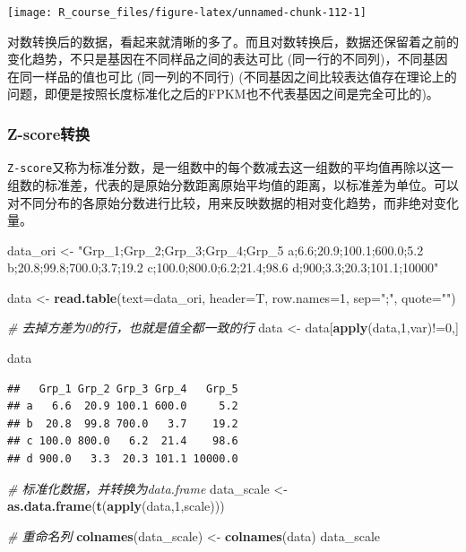 \documentclass[]{article}
\newenvironment{Shaded}{\begin{snugshade}}{\end{snugshade}}
\newcommand{\KeywordTok}[1]{\textcolor[rgb]{0.13,0.29,0.53}{\textbf{{#1}}}}
\newcommand{\DataTypeTok}[1]{\textcolor[rgb]{0.13,0.29,0.53}{{#1}}}
\newcommand{\DecValTok}[1]{\textcolor[rgb]{0.00,0.00,0.81}{{#1}}}
\newcommand{\StringTok}[1]{\textcolor[rgb]{0.31,0.60,0.02}{{#1}}}
\newcommand{\CommentTok}[1]{\textcolor[rgb]{0.56,0.35,0.01}{\textit{{#1}}}}
\newcommand{\NormalTok}[1]{{#1}}
\numberwithin{figure}{section}
\numberwithin{table}{section}
\theoremstyle{definition}
\theoremstyle{definition}
\theoremstyle{definition}
\theoremstyle{remark}
\begin{document}
\begin{center}\texttt{[image: R\_course\_files/figure-latex/unnamed-chunk-112-1]} \end{center}

对数转换后的数据，看起来就清晰的多了。而且对数转换后，数据还保留着之前的变化趋势，不只是基因在不同样品之间的表达可比
(同一行的不同列)，不同基因在同一样品的值也可比 (同一列的不同行)
(不同基因之间比较表达值存在理论上的问题，即便是按照长度标准化之后的FPKM也不代表基因之间是完全可比的)。

\subsubsection{Z-score转换}\label{z-score}

\texttt{Z-score}又称为标准分数，是一组数中的每个数减去这一组数的平均值再除以这一组数的标准差，代表的是原始分数距离原始平均值的距离，以标准差为单位。可以对不同分布的各原始分数进行比较，用来反映数据的相对变化趋势，而非绝对变化量。

\begin{Shaded}
\begin{Highlighting}[]
\NormalTok{data_ori <-}\StringTok{ "Grp_1;Grp_2;Grp_3;Grp_4;Grp_5}
\StringTok{a;6.6;20.9;100.1;600.0;5.2}
\StringTok{b;20.8;99.8;700.0;3.7;19.2}
\StringTok{c;100.0;800.0;6.2;21.4;98.6}
\StringTok{d;900;3.3;20.3;101.1;10000"}

\NormalTok{data <-}\StringTok{ }\KeywordTok{read.table}\NormalTok{(}\DataTypeTok{text=}\NormalTok{data_ori, }\DataTypeTok{header=}\NormalTok{T, }\DataTypeTok{row.names=}\DecValTok{1}\NormalTok{, }\DataTypeTok{sep=}\StringTok{";"}\NormalTok{, }\DataTypeTok{quote=}\StringTok{""}\NormalTok{)}

\CommentTok{# 去掉方差为0的行，也就是值全都一致的行}
\NormalTok{data <-}\StringTok{ }\NormalTok{data[}\KeywordTok{apply}\NormalTok{(data,}\DecValTok{1}\NormalTok{,var)!=}\DecValTok{0}\NormalTok{,]}

\NormalTok{data}
\end{Highlighting}
\end{Shaded}

\begin{verbatim}
##   Grp_1 Grp_2 Grp_3 Grp_4   Grp_5
## a   6.6  20.9 100.1 600.0     5.2
## b  20.8  99.8 700.0   3.7    19.2
## c 100.0 800.0   6.2  21.4    98.6
## d 900.0   3.3  20.3 101.1 10000.0
\end{verbatim}

\begin{Shaded}
\begin{Highlighting}[]
\CommentTok{# 标准化数据，并转换为data.frame}
\NormalTok{data_scale <-}\StringTok{ }\KeywordTok{as.data.frame}\NormalTok{(}\KeywordTok{t}\NormalTok{(}\KeywordTok{apply}\NormalTok{(data,}\DecValTok{1}\NormalTok{,scale)))}

\CommentTok{# 重命名列}
\KeywordTok{colnames}\NormalTok{(data_scale) <-}\StringTok{ }\KeywordTok{colnames}\NormalTok{(data)}
\NormalTok{data_scale}
\end{Highlighting}
\end{Shaded}
\end{document}

